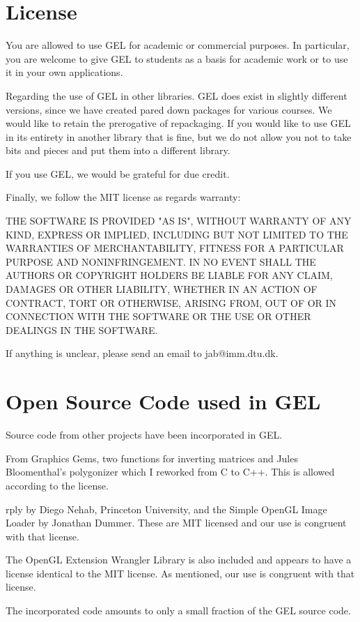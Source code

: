 \documentclass[a4paper]{article}
\begin{document}
\section{License}  
\begin{trivlist}
\item
You are allowed to use GEL for academic or commercial purposes. In particular, you are welcome to give GEL to students as a basis for academic work or to use it in your own applications.
\item
Regarding the use of GEL in other libraries. GEL does exist in slightly different versions, since we have created pared down packages for various courses. We would like to retain the prerogative of repackaging. If you would like to use GEL in its entirety in another library  that is fine, but we do not allow you not to take bits and pieces and put them into a different library.
\item
If you use GEL, we would be grateful for due credit.
\item
Finally, we follow the MIT license as regards warranty:
\item
THE SOFTWARE IS PROVIDED "AS IS", WITHOUT WARRANTY OF ANY KIND, EXPRESS OR IMPLIED, INCLUDING BUT NOT LIMITED TO THE WARRANTIES OF MERCHANTABILITY, FITNESS FOR A PARTICULAR PURPOSE AND NONINFRINGEMENT. IN NO EVENT SHALL THE AUTHORS OR COPYRIGHT HOLDERS BE LIABLE FOR ANY CLAIM, DAMAGES OR OTHER LIABILITY, WHETHER IN AN ACTION OF CONTRACT, TORT OR OTHERWISE, ARISING FROM, OUT OF OR IN CONNECTION WITH THE SOFTWARE OR THE USE OR OTHER DEALINGS IN THE SOFTWARE.
\item
If anything is unclear, please send an email to jab@imm.dtu.dk. 
\end{trivlist}
\section{Open Source Code used in GEL}  

Source code from other projects have been incorporated in GEL.
\begin{trivlist}
\item From Graphics Gems, two functions for inverting matrices and Jules Bloomenthal's polygonizer which I reworked from C to C++. This is allowed according to the license.
\item rply by Diego Nehab, Princeton University, and the Simple OpenGL Image Loader by Jonathan Dummer.  These are MIT licensed and our use is congruent with that license.
\item The OpenGL Extension Wrangler Library is also included and appears to have a license identical to the MIT license.	 As mentioned, our use is congruent with that license.
\end{trivlist}
The incorporated code amounts to only a small fraction of the GEL source code.
\end{document}
